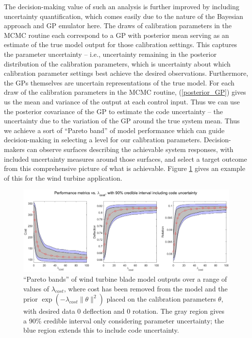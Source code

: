 \documentclass{article}
\begin{document}
The decision-making value of such an analysis is further improved by including uncertainty quantification, which comes easily due to the nature of the Bayesian approach and GP emulator here. The draws of calibration parameters in the MCMC routine each correspond to a GP with posterior mean serving as an estimate of the true model output for those calibration settings. This captures the parameter uncertainty -- i.e., uncertainty remaining in the posterior distribution of the calibration parameters, which is uncertainty about which calibration parameter settings best achieve the desired observations. Furthermore, the GPs themselves are uncertain representations of the true model. For each draw of the calibration parameters in the MCMC routine, (\ref{posterior_GP}) gives us the mean and variance of the output at each control input. Thus we can use the posterior covariance of the GP to estimate the code uncertainty -- the uncertainty due to the variation of the GP around the true system mean. Thus we achieve a sort of ``Pareto band'' of model performance which can guide decision-making in selecting a level for our calibration parameters. Decision-makers can observe surfaces describing the achievable system responses, with included uncertainty measures around those surfaces, and select a target outcome from this comprehensive picture of what is achievable. Figure \ref{fig:non-uniform_prior} gives an example of this for the wind turbine application.

\begin{figure}
\centering
\captionsetup{width=.9\linewidth}
\includegraphics[width=.9\linewidth]{FIG_cost_lambda_code_uncert}
\caption{``Pareto bands'' of wind turbine blade model outputs over a range of values of $\lambda_{cost}$, where cost has been removed from the model and the prior $\exp(-\lambda_{cost}\lVert \theta \rVert^2)$ placed on the calibration parameters $\theta$, with desired data 0 deflection and 0 rotation. The gray region gives a 90\% credible interval only considering parameter uncertainty; the blue region extends this to include code uncertainty.}
\label{fig:non-uniform_prior}
\end{figure}
\end{document}
